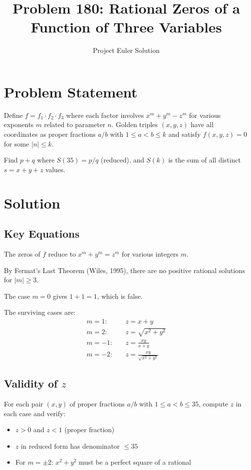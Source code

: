 \documentclass[12pt]{article}
\title{Problem 180: Rational Zeros of a Function of Three Variables}
\author{Project Euler Solution}
\date{}
\begin{document}
\maketitle

\section{Problem Statement}

Define $f = f_1 \cdot f_2 \cdot f_3$ where each factor involves $x^m + y^m - z^m$ for various exponents $m$ related to parameter $n$. Golden triples $(x,y,z)$ have all coordinates as proper fractions $a/b$ with $1 \leq a < b \leq k$ and satisfy $f(x,y,z) = 0$ for some $|n| \leq k$.

Find $p + q$ where $S(35) = p/q$ (reduced), and $S(k)$ is the sum of all distinct $s = x + y + z$ values.

\section{Solution}

\subsection{Key Equations}

The zeros of $f$ reduce to $x^m + y^m = z^m$ for various integers $m$.

By Fermat's Last Theorem (Wiles, 1995), there are no positive rational solutions for $|m| \geq 3$.

The case $m = 0$ gives $1 + 1 = 1$, which is false.

The surviving cases are:
\begin{align}
m = 1: &\quad z = x + y \\
m = 2: &\quad z = \sqrt{x^2 + y^2} \\
m = -1: &\quad z = \frac{xy}{x+y} \\
m = -2: &\quad z = \frac{xy}{\sqrt{x^2 + y^2}}
\end{align}

\subsection{Validity of $z$}

For each pair $(x, y)$ of proper fractions $a/b$ with $1 \leq a < b \leq 35$, compute $z$ in each case and verify:
\begin{itemize}
\item $z > 0$ and $z < 1$ (proper fraction)
\item $z$ in reduced form has denominator $\leq 35$
\item For $m = \pm 2$: $x^2 + y^2$ must be a perfect square of a rational
\end{itemize}
\end{document}
